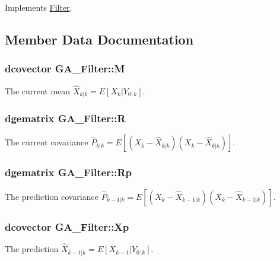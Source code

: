 Implements \hyperlink{class_filter_f6e41ec8ada47571291b31a259858cdc}{Filter}.

\subsection{Member Data Documentation}
\hypertarget{class_g_a___filter_8845e79b2c552edab83a18313bb48427}{
\subsubsection[{M}]{\setlength{\rightskip}{0pt plus 5cm}dcovector {\bf GA\_\-Filter::M}}}
\label{class_g_a___filter_8845e79b2c552edab83a18313bb48427}


The current mean $ \hat{X}_{k|k}=E[X_k |Y_{0:k}] $. 

\hypertarget{class_g_a___filter_6a52a9cb2bbe7b568bdea626c951388f}{
\subsubsection[{R}]{\setlength{\rightskip}{0pt plus 5cm}dgematrix {\bf GA\_\-Filter::R}}}
\label{class_g_a___filter_6a52a9cb2bbe7b568bdea626c951388f}


The current covariance $ \hat{P}_{k|k}=E[(X_k-\hat{X}_{k|k})(X_k-\hat{X}_{k|k})] $. 

\hypertarget{class_g_a___filter_7d6e23cf07e5b031d617f33ee25cab06}{
\subsubsection[{Rp}]{\setlength{\rightskip}{0pt plus 5cm}dgematrix {\bf GA\_\-Filter::Rp}}}
\label{class_g_a___filter_7d6e23cf07e5b031d617f33ee25cab06}


The prediction covariance $ \hat{P}_{k-1|k}=E[(X_k-\hat{X}_{k-1|k})(X_k-\hat{X}_{k-1|k}) ] $. 

\hypertarget{class_g_a___filter_9490630ecc3f4503003b8640eefe106a}{
\subsubsection[{Xp}]{\setlength{\rightskip}{0pt plus 5cm}dcovector {\bf GA\_\-Filter::Xp}}}
\label{class_g_a___filter_9490630ecc3f4503003b8640eefe106a}


The prediction $ \hat{X}_{k-1|k}=E[X_{k-1} |Y_{0:k}] $. 

